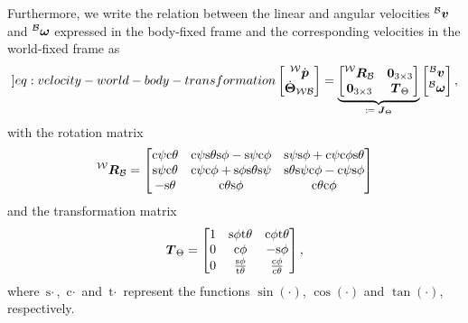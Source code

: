Furthermore, we write the relation between the linear and angular velocities $\prescript{\mathcal{B}}{}{\mbox{$\bm{v}$}}$ and $\prescript{\mathcal{B}}{}{\mbox{$\bm{\omega}$}}$ expressed in the body-fixed frame and the corresponding velocities in the world-fixed frame as
\begin{equation}
	\label[]{eq:velocity-world-body-transformation}
	\begin{bmatrix}
		\vlinworld \\
		\vangworld
	\end{bmatrix}
	=
	\underbrace{
	\begin{bmatrix}
		\Rbodyworld & \bm{0}_{3 \times 3} \\
		\bm{0}_{3 \times 3} & \TbodyWorld
	\end{bmatrix}
	}_{\mbox{\scriptsize $\coloneqq \Jb_\Theta$}}
	\begin{bmatrix}
		\vlinbody \\
		\vangbody
	\end{bmatrix},
\end{equation}
with the rotation matrix 
\begin{equation}
	\label{eq:rotation-matrix}
	\Rbodyworld = 
	\begin{bmatrix}
		\text{c}\psi\text{c}\theta
		& \text{c}\psi \text{s}\theta \text{s}\phi - \text{s}\psi \text{c}\phi
		& \text{s}\psi \text{s}\phi + \text{c}\psi \text{c}\phi \text{s} \theta \\
		\text{s}\psi \text{c}\theta
		& \text{c}\psi \text{c}\phi + \text{s}\phi \text{s}\theta \text{s}\psi
		& \text{s}\theta \text{s}\psi \text{c}\phi - \text{c}\psi \text{s}\phi \\
		-\text{s}\theta
		& \text{c}\theta \text{s}\phi
		& \text{c}\theta \text{c}\phi
	\end{bmatrix}
\end{equation}
and the transformation matrix
\begin{equation}
	\label{eq:transformation}
	\mbox{$\bm{T}$}_\Theta = 
	\begin{bmatrix}
		1 & \text{s}\phi \text{t}\theta & \text{c}\phi \text{t}\theta \\
		0 & \text{c}\phi & -\text{s}\phi \\
		0 & \frac{\text{s}\phi}{\text{t}\theta} & \frac{\text{c}\phi}{\text{c}\theta}
	\end{bmatrix},
\end{equation}
where $\text{s}\cdot$, $\text{c}\cdot$ and $\text{t}\cdot$ represent the functions $\sin(\cdot)$, $\cos(\cdot)$ and $\tan(\cdot)$, respectively.

